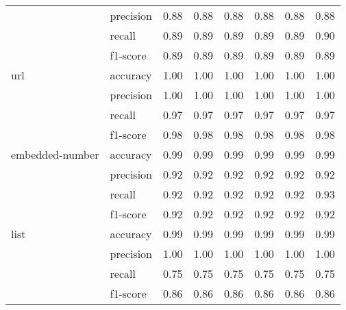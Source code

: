 \begin{tabular}{llrrrrrr}
                 & precision &            0.88 &            0.88 &            0.88 &            0.88 &            0.88 &             0.88 \\
                 & recall &            0.89 &            0.89 &            0.89 &            0.89 &            0.89 &             0.90 \\
                 & f1-score &            0.89 &            0.89 &            0.89 &            0.89 &            0.89 &             0.89 \\
url & accuracy &            1.00 &            1.00 &            1.00 &            1.00 &            1.00 &             1.00 \\
                 & precision &            1.00 &            1.00 &            1.00 &            1.00 &            1.00 &             1.00 \\
                 & recall &            0.97 &            0.97 &            0.97 &            0.97 &            0.97 &             0.97 \\
                 & f1-score &            0.98 &            0.98 &            0.98 &            0.98 &            0.98 &             0.98 \\
embedded-number & accuracy &            0.99 &            0.99 &            0.99 &            0.99 &            0.99 &             0.99 \\
                 & precision &            0.92 &            0.92 &            0.92 &            0.92 &            0.92 &             0.92 \\
                 & recall &            0.92 &            0.92 &            0.92 &            0.92 &            0.92 &             0.93 \\
                 & f1-score &            0.92 &            0.92 &            0.92 &            0.92 &            0.92 &             0.92 \\
list & accuracy &            0.99 &            0.99 &            0.99 &            0.99 &            0.99 &             0.99 \\
                 & precision &            1.00 &            1.00 &            1.00 &            1.00 &            1.00 &             1.00 \\
                 & recall &            0.75 &            0.75 &            0.75 &            0.75 &            0.75 &             0.75 \\
                 & f1-score &            0.86 &            0.86 &            0.86 &            0.86 &            0.86 &             0.86 \\

\end{tabular}
